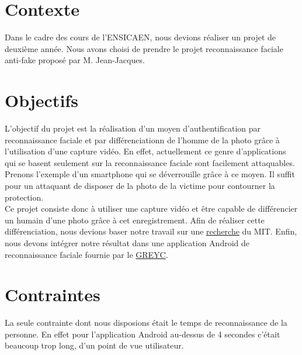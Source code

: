 \section{Contexte}

Dans le cadre des cours de l'ENSICAEN, nous devions réaliser un projet de deuxième année. Nous avons choisi de prendre le projet reconnaissance faciale anti-fake proposé
par M.  Jean-Jacques.

\section{Objectifs}

L'objectif du projet est la réalisation d'un moyen d'authentification par reconnaissance faciale et par différenciationn de l'homme de la photo  grâce à l'utilisation d'une capture vidéo. En effet, actuellement ce genre d'applications qui se basent seulement sur la reconnaissance faciale sont facilement
attaquables. Prenons l'exemple d'un smartphone qui se déverrouille grâce à ce moyen. Il suffit pour un attaquant de disposer de la photo de la victime pour contourner la protection. \\
Ce projet consiste donc à utiliser une capture vidéo et être capable de différencier un humain d'une photo grâce à cet enregistrement. Afin de réaliser cette différenciation, nous devions baser notre travail sur une \href{http://people.csail.mit.edu/mrub/papers/vidmag.pdf}{recherche} du MIT\@. Enfin, nous devons intégrer notre résultat dans une application Android de reconnaissance faciale fournie par le \href{https://www.greyc.fr/}{GREYC}.

\section{Contraintes}

La seule contrainte dont nous disposions était le temps de reconnaissance de la personne. En effet pour l'application Android au-dessus de 4 secondes c'était beaucoup trop long, d'un point de vue
utilisateur.
